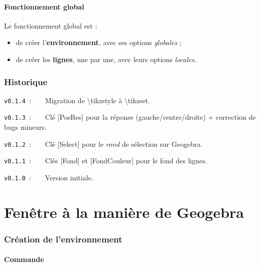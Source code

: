 \documentclass[french,a4paper,11pt]{article}
\begin{document}
\subsection{Fonctionnement global}

\begin{importantblock}
Le fonctionnement global est :

\begin{itemize}
	\item de créer l'\textbf{environnement}, avec ses options \textit{globales} ;
	\item de créer les \textbf{lignes}, une par une, avec leurs options \textit{locales}.
\end{itemize}
\vspace*{-\baselineskip}\leavevmode
\end{importantblock}

\vfill

\section{Historique}

\verb|v0.1.4|~:~~~~Migration de \textsf{\textbackslash tikzstyle} à \textsf{\textbackslash tikzset}.

\verb|v0.1.3|~:~~~~Clé \textsf{[PosRes]} pour la réponse (gauche/centre/droite) + correction de bugs mineurs.

\verb|v0.1.2|~:~~~~Clé \textsf{[Select]} pour le \textit{rond} de sélection sur Geogebra.

\verb|v0.1.1|~:~~~~Clés \textsf{[Fond]} et \textsf{[FondCouleur]} pour le fond des lignes.

\verb|v0.1.0|~:~~~~Version initiale.

\hspace*{1cm}

\pagebreak

\part{Fenêtre à la manière de Geogebra}

\section{Création de l'environnement}

\subsection{Commande}
\end{document}
